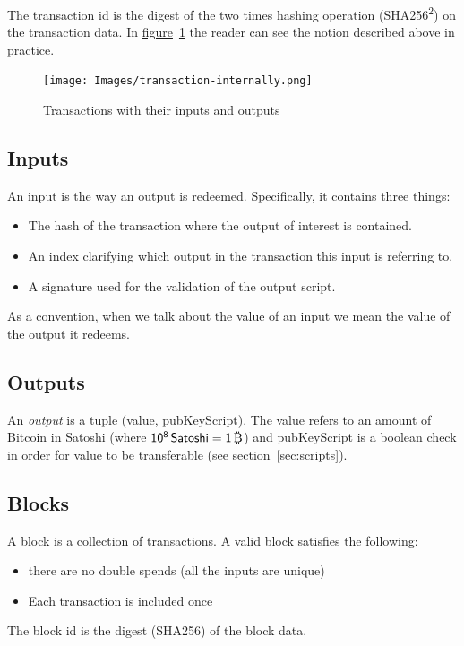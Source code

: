 The transaction id is the digest of the two times hashing operation (SHA256\textsuperscript{2}) on the transaction data. In \hyperref[fig:transaction-internally]{figure}~\ref{fig:transaction-internally} the reader can see the notion described above in practice.

\vspace{0.3cm}
\begin{figure}[ht]
  \centering
  \texttt{[image: Images/transaction-internally.png]}
  \caption{Transactions with their inputs and outputs~\cite{mastering}}
  \label{fig:transaction-internally}
\end{figure}

\subsection{Inputs} \label{sec:inputs}
An input is the way an output is redeemed. Specifically, it contains three things:
\begin{itemize}
  \item The hash of the transaction where the output of interest is contained.
  \item An index clarifying which output in the transaction this input is referring to.
  \item A signature used for the validation of the output script.
\end{itemize}

As a convention, when we talk about the value of an input we mean the value of the output it redeems.

\subsection{Outputs} \label{sec:outputs}
An \emph{output} is a tuple ({\sf value, pubKeyScript}). The \textsf{value} refers to an amount of Bitcoin in Satoshi (where $\sf 10^8 \, Satoshi = 1 \, \bitcoin$) and \textsf{pubKeyScript} is a boolean check in order for \textsf{value} to be transferable (see \hyperref[sec:scripts]{section}~\ref{sec:scripts}).

\subsection{Blocks} \label{sec:blocks}
A block is a collection of transactions. A valid block satisfies the following:

\begin{itemize}
  \item there are no double spends (all the inputs are unique)
  \item Each transaction is included once
\end{itemize}
The block id is the digest (SHA256) of the block data.

